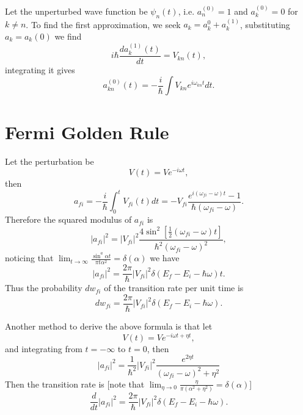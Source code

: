 \documentclass{book}
\numberwithin{equation}{section}
\begin{document}
Let the unperturbed wave function be $\psi_n(t)$, i.e. $a_n^{(0)}=1$
and $a_k^{(0)}=0$ for $k\ne n$. To find the first approximation, we
seek $a_k=a_k^{0}+a_k^{(1)}$, substituting $a_k=a_k(0)$ we find
\begin{equation}
  i\hbar \frac{da_k^{(1)}(t)}{dt}=V_{kn}(t),
\end{equation}
integrating it gives
\begin{equation}
  a_{kn}^{(0)}(t)=-\frac{i}{\hbar}\int V_{kn}e^{i\omega_{kn}t}dt.
\end{equation}

\section{Fermi Golden Rule}
Let the perturbation be
\begin{equation}
  V(t)=Ve^{-i\omega t},
\end{equation}
then
\begin{equation}
  a_{fi}=-\frac{i}{\hbar}\int_0^tV_{fi}(t)dt=
  -V_{fi}\frac{e^{i(\omega_{fi}-\omega)t}-1}{\hbar(\omega_{fi}-\omega)}.
\end{equation}
Therefore the squared modulus of $a_{fi}$ is
\begin{equation}
  |a_{fi}|^2=|V_{fi}|^2\frac{4\sin^2[\frac{1}{2}(\omega_{fi}-\omega)t]}
{\hbar^2(\omega_{fi}-\omega)^2},
\end{equation}
noticing that $\lim_{t\to\infty}\frac{\sin^a\alpha t}{\pi t\alpha^2}=\delta(\alpha)$ we have
\begin{equation}
  |a_{fi}|^2=\frac{2\pi}{\hbar}|V_{fi}|^2\delta(E_f-E_i-\hbar\omega)t.
\end{equation}
Thus the probability $dw_{fi}$ of the transition rate per unit time is
\begin{equation}
  dw_{fi}=\frac{2\pi}{\hbar}|V_{fi}|^2\delta(E_f-E_i-\hbar\omega).
\end{equation}

Another method to derive the above formula is that let 
\begin{equation}
  V(t)=Ve^{-i\omega t+\eta t},
\end{equation}
and integrating from $t=-\infty$ to $t=0$, then
\begin{equation}
  |a_{fi}|^2=\frac{1}{\hbar^2}|V_{fi}|^2\frac{e^{2\eta t}}
{(\omega_{fi}-\omega)^2+\eta^2}
\end{equation}
Then the transition rate is [note that
$\lim_{\eta\to0}\frac{\eta}{\pi(\alpha^2+\eta^2)}=\delta(\alpha)$]
\begin{equation}
  \frac{d}{dt}|a_{fi}|^2=\frac{2\pi}{\hbar}|V_{fi}|^2\delta(E_f-E_i-\hbar\omega).
\end{equation}
\end{document}
